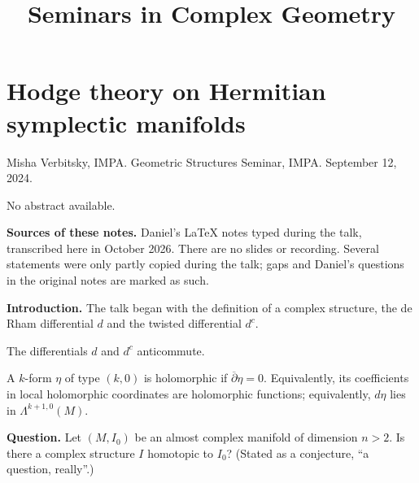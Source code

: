







\title{Seminars in Complex Geometry}

\maketitle




\label{section-phantom}



\tableofcontents



\section{Hodge theory on Hermitian
symplectic manifolds}
\label{section-verbitsky-herm-symplectic}

\noindent
Misha Verbitsky, IMPA.
Geometric Structures Seminar, IMPA.
September 12, 2024.

\medskip\noindent
No abstract available.

\medskip\noindent
{\bf Sources of these notes.} Daniel's
LaTeX notes typed during the talk,
transcribed here in October 2026. There are
no slides or recording. Several statements
were only partly copied during the talk;
gaps and Daniel's questions in the original
notes are marked as such.

\medskip\noindent
{\bf Introduction.} The talk began with the
definition of a complex structure, the de
Rham differential $d$ and the twisted
differential $d^c$.

\begin{remark}
\label{remark-verbitsky-anticommute}
The differentials $d$ and $d^c$
anticommute.
\end{remark}

\begin{remark}
\label{remark-verbitsky-holomorphic-forms}
A $k$-form $\eta$ of type $(k,0)$ is
holomorphic if $\overline{\partial}\eta=0$.
Equivalently, its coefficients in local
holomorphic coordinates are holomorphic
functions; equivalently, $d\eta$ lies in
$\Lambda^{k+1,0}(M)$.
\end{remark}

\medskip\noindent
{\bf Question.} Let $(M,I_0)$ be an almost
complex manifold of dimension $n>2$. Is
there a complex structure $I$ homotopic to
$I_0$? (Stated as a conjecture, ``a
question, really''.)

